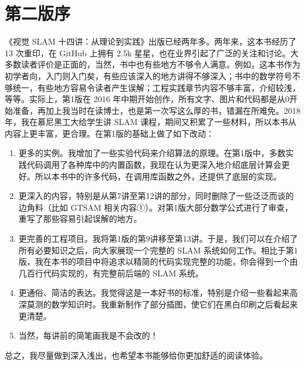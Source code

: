 \thispagestyle{empty}
\chapter*{第二版序}
《视觉 SLAM 十四讲：从理论到实践》出版已经两年多。两年来，这本书经历了 13 次重印，在 GitHub 上拥有 2.5k 星星，也在业界引起了广泛的关注和讨论。大多数读者评价是正面的，当然，书中也有些地方不够令人满意。例如，这本书作为初学者向，入门则入门矣，有些应该深入的地方讲得不够深入；书中的数学符号不够统一，有些地方容易令读者产生误解；工程实践章节内容不够丰富，介绍较浅，等等。实际上，第1版在 2016 年中期开始创作，所有文字、图片和代码都是从0开始准备，再加上我当时在读博士，也是第一次写这么厚的书，错漏在所难免。2018 年，我在慕尼黑工大给学生讲 SLAM 课程，期间又积累了一些材料，所以本书从内容上更丰富，更合理。在第1版的基础上做了如下改动：

\begin{enumerate}
\item 更多的实例。我增加了一些实验代码来介绍算法的原理。在第1版中，多数实践代码调用了各种库中的内置函数，我现在认为更深入地介绍底层计算会更好。所以本书中的许多代码，在调用库函数之外，还提供了底层的实现。
\item 更深入的内容，特别是从第7讲至第12讲的部分，同时删除了一些泛泛而谈的边角料（比如 GTSAM 相关内容➀）。对第1版大部分数学公式进行了审查，重写了那些容易引起误解的地方。
\item 更完善的工程项目。我将第1版的第9讲移至第13讲。于是，我们可以在介绍了所有必要知识之后，向大家展现一个完整的 SLAM 系统如何工作。相比于第1版，我在本书的项目中将追求以精简的代码实现完整的功能，你会得到一个由几百行代码实现的，有完整前后端的 SLAM 系统。
\item 更通俗、简洁的表达。我觉得这是一本好书的标准，特别是介绍一些看起来高深莫测的数学知识时。我重新制作了部分插图，使它们在黑白印刷之后看起来更清楚。
\item 当然，每讲前的简笔画我是不会改的！
\end{enumerate}
总之，我尽量做到深入浅出，也希望本书能够给你更加舒适的阅读体验。

\clearpage